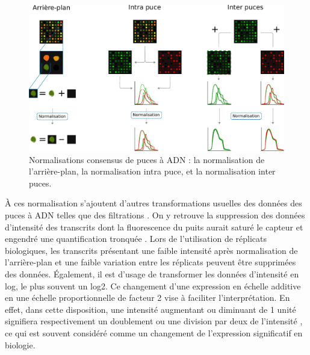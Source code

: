 \begin{figure}[!h]
    \centering
    \includegraphics[width=\textwidth]{img/intro/microarray_normalization.pdf}
    \caption[Normalisations consensus de puces à ADN]{Normalisations consensus de puces à ADN : la normalisation de l'arrière-plan, la normalisation intra puce, et la normalisation inter puces.}
    \label{fig:microarray_normalization}
\end{figure}


À ces normalisation s'ajoutent d'autres transformations usuelles des données des puces à ADN telles que des filtrations \cite{Quackenbush2002Dec}. On y retrouve la suppression des données d'intensité des transcrits dont la fluorescence du puits aurait saturé le capteur et engendré une quantification tronquée \cite{Wilkes2007Apr}. Lors de l'utilisation de réplicats biologiques, les transcrits présentant une faible intensité après normalisation de l'arrière-plan et une faible variation entre les réplicats peuvent être supprimées des données. Également, il est d'usage de transformer les données d'intensité en log, le plus souvent un log2. Ce changement d'une expression en échelle additive en une échelle proportionnelle de facteur 2 vise à faciliter l'interprétation. En effet, dans cette disposition, une intensité augmentant ou diminuant de 1 unité signifiera respectivement un doublement ou une division par deux de l'intensité \cite{Smyth2003Dec}, ce qui est souvent considéré comme un changement de l'expression significatif en biologie. 


